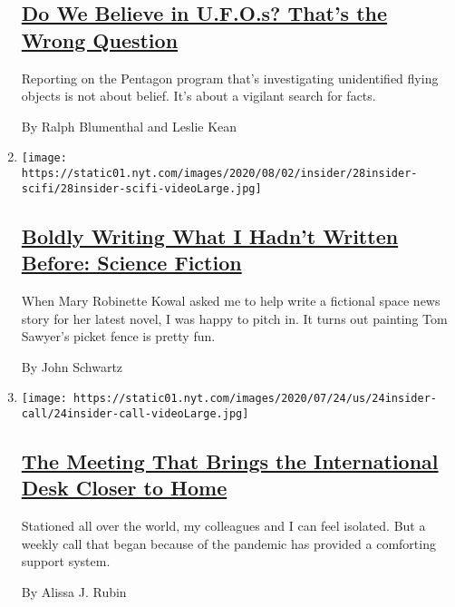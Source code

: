 \begin{enumerate}
  \hypertarget{do-we-believe-in-ufos-thats-the-wrong-question}{%
  \subsection{\texorpdfstring{\href{/2020/07/28/insider/UFO-reporting.html}{Do
  We Believe in U.F.O.s? That's the Wrong
  Question}}{Do We Believe in U.F.O.s? That's the Wrong Question}}\label{do-we-believe-in-ufos-thats-the-wrong-question}}

  Reporting on the Pentagon program that's investigating unidentified
  flying objects is not about belief. It's about a vigilant search for
  facts.

  By Ralph Blumenthal and Leslie Kean
\item
  \texttt{[image: https://static01.nyt.com/images/2020/08/02/insider/28insider-scifi/28insider-scifi-videoLarge.jpg]}

  \hypertarget{boldly-writing-what-i-hadnt-written-before-science-fiction}{%
  \subsection{\texorpdfstring{\href{/2020/07/28/insider/science-fiction-novel-mary-robinette-kowal.html}{Boldly
  Writing What I Hadn't Written Before: Science
  Fiction}}{Boldly Writing What I Hadn't Written Before: Science Fiction}}\label{boldly-writing-what-i-hadnt-written-before-science-fiction}}

  When Mary Robinette Kowal asked me to help write a fictional space
  news story for her latest novel, I was happy to pitch in. It turns out
  painting Tom Sawyer's picket fence is pretty fun.

  By John Schwartz
\item
  \texttt{[image: https://static01.nyt.com/images/2020/07/24/us/24insider-call/24insider-call-videoLarge.jpg]}

  \hypertarget{the-meeting-that-brings-the-international-desk-closer-to-home}{%
  \subsection{\texorpdfstring{\href{/2020/07/24/insider/international-journalists-meeting.html}{The
  Meeting That Brings the International Desk Closer to
  Home}}{The Meeting That Brings the International Desk Closer to Home}}\label{the-meeting-that-brings-the-international-desk-closer-to-home}}

  Stationed all over the world, my colleagues and I can feel isolated.
  But a weekly call that began because of the pandemic has provided a
  comforting support system.

  By Alissa J. Rubin
\end{enumerate}

